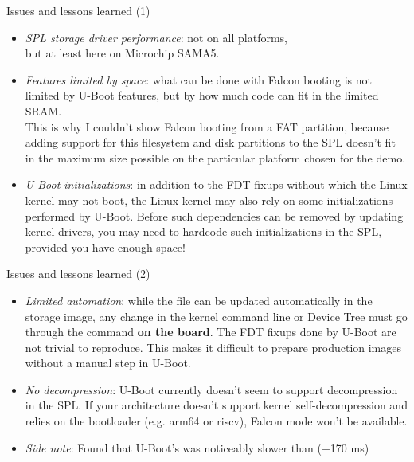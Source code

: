 \begin{frame}{Issues and lessons learned (1)}
   \begin{itemize}
      \item {\em SPL storage driver performance}: not on all platforms,\\
	    but at least here on Microchip SAMA5.
      \item {\em Features limited by space}: what can be done with
            Falcon booting is not limited by U-Boot features, but by how much code
	    can fit in the limited SRAM.\\
	    This is why I couldn't show Falcon booting from a FAT
            partition, because adding support for this filesystem and disk partitions to
	    the SPL doesn't fit in the maximum size possible on the particular
	    platform chosen for the demo.
      \item {\em U-Boot initializations}: in addition to the FDT fixups without which
            the Linux kernel may not boot, the Linux kernel may also rely on some
            initializations performed by U-Boot. Before such dependencies
	    can be removed by updating kernel drivers, you may need to
	    hardcode such initializations in the SPL, provided you have enough
	    space!
   \end{itemize}
\end{frame}

\begin{frame}{Issues and lessons learned (2)}
   \begin{itemize}
      \item {\em Limited automation}: while the  file can be updated
            automatically in the storage image, any change in the kernel
	    command line or Device Tree must go through the  command
            {\bf on the board}. The FDT fixups done by U-Boot are not trivial to
            reproduce. This makes it difficult to prepare production images without a
            manual step in U-Boot.
      \item {\em No decompression}: U-Boot currently doesn't seem to
	    support decompression in the SPL. If your architecture
            doesn't support kernel self-decompression and relies on the bootloader
	    (e.g. arm64 or riscv), Falcon mode won't be available.
      \item {\em Side note}: Found that U-Boot's  was
	    noticeably slower than  (+170 ms)
   \end{itemize}
\end{frame}

